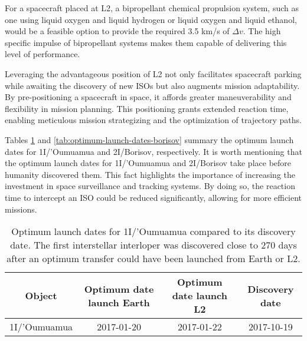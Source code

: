 For a spacecraft placed at L2, a bipropellant chemical propulsion system, such
as one using liquid oxygen and liquid hydrogen or liquid oxygen and liquid
ethanol, would be a feasible option to provide the required 3.5 km/s of $\Delta
v$. The high specific impulse of bipropellant systems makes them capable of
delivering this level of performance.

Leveraging the advantageous position of L2 not only facilitates spacecraft
parking while awaiting the discovery of new ISOs but also augments mission
adaptability. By pre-positioning a spacecraft in space, it affords greater
maneuverability and flexibility in mission planning. This positioning grants
extended reaction time, enabling meticulous mission strategizing and the
optimization of trajectory paths.

Tables \ref{tab:optimum-launch-dates-oumuamua} and
\ref{tab:optimum-launch-dates-borisov} summary the optimum launch dates for
1I/'Oumuamua and 2I/Borisov, respectively. It is worth mentioning that the
optimum launch dates for 1I/'Oumuamua and 2I/Borisov take place before humanity
discovered them. This fact highlights the importance of increasing the
investment in space surveillance and tracking systems. By doing so, the reaction
time to intercept an ISO could be reduced significantly, allowing for more
efficient missions.

\vspace{1cm}
\begin{table}[H]
    \centering
    \begin{tabular}{|c|c|c|c|}
    \hline
    Object       & Optimum date launch Earth & Optimum date launch L2 & Discovery date \\
    \hline
    1I/'Oumuamua & 2017-01-20                 & 2017-01-22             & 2017-10-19     \\
    \hline
    \end{tabular}
    \caption[Optimum launch dates for 1I/'Oumuamua compared to discovery its
        discovery date]{Optimum launch dates for
        1I/'Oumuamua compared to its discovery date. The first interstellar
        interloper was discovered close to 270 days after an optimum transfer
        could have been launched from Earth or L2.}
    \label{tab:optimum-launch-dates-oumuamua}
\end{table}

